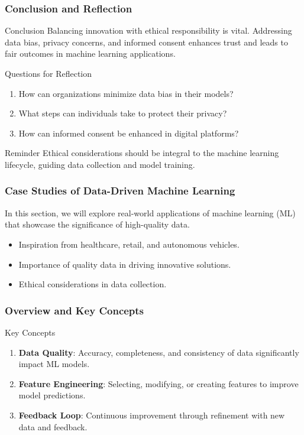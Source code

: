 \documentclass[aspectratio=169]{beamer}
\begin{document}
\begin{frame}[fragile]
    \frametitle{Conclusion and Reflection}
    \begin{block}{Conclusion}
        Balancing innovation with ethical responsibility is vital. Addressing data bias, privacy concerns, and informed consent enhances trust and leads to fair outcomes in machine learning applications.
    \end{block}

    \begin{block}{Questions for Reflection}
        \begin{enumerate}
            \item How can organizations minimize data bias in their models?
            \item What steps can individuals take to protect their privacy?
            \item How can informed consent be enhanced in digital platforms?
        \end{enumerate}
    \end{block}
    
    \begin{block}{Reminder}
        Ethical considerations should be integral to the machine learning lifecycle, guiding data collection and model training.
    \end{block}
\end{frame}

\begin{frame}[fragile]
    \frametitle{Case Studies of Data-Driven Machine Learning}
    In this section, we will explore real-world applications of machine learning (ML) that showcase the significance of high-quality data. 
    \begin{itemize}
        \item Inspiration from healthcare, retail, and autonomous vehicles.
        \item Importance of quality data in driving innovative solutions.
        \item Ethical considerations in data collection.
    \end{itemize}
\end{frame}

\begin{frame}[fragile]
    \frametitle{Overview and Key Concepts}
    \begin{block}{Key Concepts}
        \begin{enumerate}
            \item \textbf{Data Quality}: Accuracy, completeness, and consistency of data significantly impact ML models.
            \item \textbf{Feature Engineering}: Selecting, modifying, or creating features to improve model predictions.
            \item \textbf{Feedback Loop}: Continuous improvement through refinement with new data and feedback.
        \end{enumerate}
    \end{block}
\end{frame}
\end{document}
